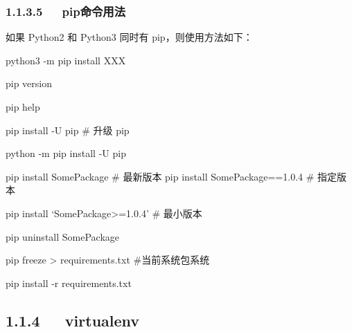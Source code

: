 \documentclass[letterpaper,12pt,english]{sphinxmanual}
\begin{document}
\subsubsection{1.1.3.5   pip命令用法}
\label{\detokenize{001software/001install/python:id5}}
\begin{DUlineblock}{0em}
\item[] 如果 Python2 和 Python3 同时有 pip，则使用方法如下：
\item[] python3 -m pip install XXX
\end{DUlineblock}

\begin{DUlineblock}{0em}
\item[] pip \textendash{}version
\item[] pip \textendash{}help
\item[] pip install -U pip \# 升级 pip
\item[] python -m pip install -U pip
\item[] pip install SomePackage \# 最新版本 pip install SomePackage==1.0.4 \#
指定版本
\item[] pip install ‘SomePackage\textgreater{}=1.0.4’ \# 最小版本
\item[] pip uninstall SomePackage
\end{DUlineblock}

\begin{DUlineblock}{0em}
\item[] pip freeze \textgreater{} requirements.txt \#当前系统包系统
\item[] pip install -r requirements.txt
\end{DUlineblock}


\subsection{1.1.4   virtualenv}
\label{\detokenize{001software/001install/python:virtualenv}}

\begin{sphinxVerbatim}[commandchars=\\\{\}]
  
\PYGZbs{}\PYGZbs{}\PYGZbs{}\PYGZbs{}\PYGZbs{}
\end{sphinxVerbatim}
\end{document}
